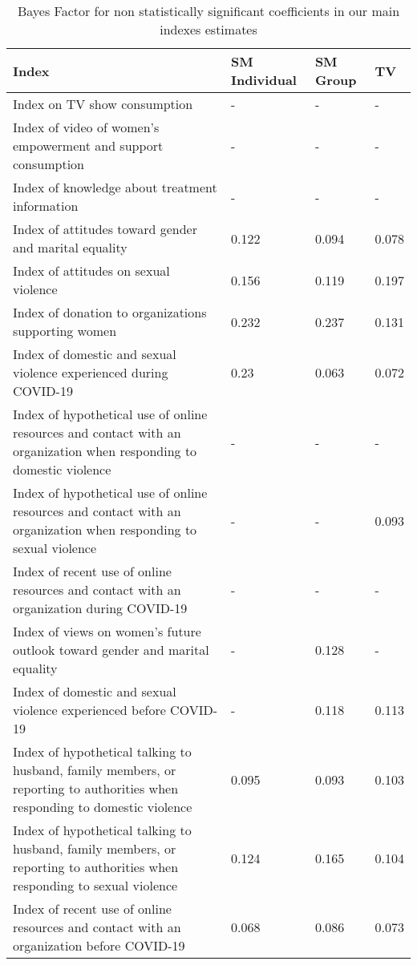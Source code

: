 \begin{table}[H]
\centering
\caption{Bayes Factor for non statistically significant coefficients in our main indexes estimates} 
\label{tab:BayesFactor}
\begingroup\scriptsize
\begin{tabular}{p{}p{}p{}p{}}
  \hline
Index & SM Individual & SM Group & TV \\ 
  \hline
Index on TV show consumption & - & - & - \\ 
  Index of video of women's empowerment and support consumption & - & - & - \\ 
  Index of knowledge about treatment information & - & - & - \\ 
  Index of attitudes toward gender and marital equality & 0.122 & 0.094 & 0.078 \\ 
  Index of attitudes on sexual violence & 0.156 & 0.119 & 0.197 \\ 
  Index of donation to organizations supporting women & 0.232 & 0.237 & 0.131 \\ 
  Index of domestic and sexual violence experienced during COVID-19 & 0.23 & 0.063 & 0.072 \\ 
  Index of hypothetical use of online resources and contact with an organization when responding to domestic violence & - & - & - \\ 
  Index of hypothetical use of online resources and contact with an organization when responding to sexual violence & - & - & 0.093 \\ 
  Index of recent use of online resources and contact with an organization during COVID-19 & - & - & - \\ 
  Index of views on women's future outlook toward gender and marital equality & - & 0.128 & - \\ 
  Index of domestic and sexual violence experienced before COVID-19 & - & 0.118 & 0.113 \\ 
  Index of hypothetical talking to husband, family members, or reporting to authorities when responding to domestic violence & 0.095 & 0.093 & 0.103 \\ 
  Index of hypothetical talking to husband, family members, or reporting to authorities when responding to sexual violence & 0.124 & 0.165 & 0.104 \\ 
  Index of recent use of online resources and contact with an organization before COVID-19 & 0.068 & 0.086 & 0.073 \\ 
   \hline
\end{tabular}
\endgroup
{} \end{table}
 
